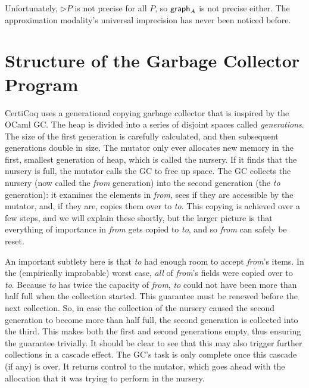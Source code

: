 \documentclass[acmsmall,review,anonymous]{acmart}\settopmatter{printfolios=true,printccs=false,printacmref=false}
\newcommand\hide[1]{}
\begin{document}
Unfortunately, $\rhd P$ is not precise for all $P$, so $\mathsf{graph}_A$ is not precise either.  The approximation modality's universal imprecision has never been noticed before.

\section{Structure of the Garbage Collector Program}
\label{apx:gcstructure}



CertiCoq uses a generational copying garbage collector 
that is inspired by the OCaml GC. 
\hide{It leans on the empirical observation that
new blocks often need to be collected soon after their
allocation, while blocks that survive this initial
culling tend to live for much longer.
}The heap is divided into a series of disjoint
spaces called \emph{generations}. The size of the first generation
is carefully calculated, and then subsequent generations
double in size.
The mutator only ever allocates new memory in the first, 
smallest generation of heap, which is called the nursery. 
If it finds that the nursery is full, 
the mutator calls the GC to free up space.
The GC collects the nursery 
(now called the \emph{from} generation)
into the second generation (the \emph{to} generation): 
it examines the elements 
in \emph{from}, sees if they are accessible by
the mutator, and, if they are, 
copies them over to \emph{to}. This copying is achieved over a few steps, 
and we will explain these shortly, but the larger picture is that 
everything of importance in \emph{from} gets copied to \emph{to}, 
and so \emph{from} can safely be reset. 

An important subtlety here is that \emph{to} had enough 
room to accept \emph{from}'s items. 
In the (empirically improbable) worst case, 
\emph{all} of \emph{from}'s fields were copied over to \emph{to}.
Because \emph{to} has twice the capacity of \emph{from},
\emph{to} could not have been more than half full when 
the collection started.
This guarantee must be renewed before the next collection. 
So, in case the collection of the nursery caused
the second generation to become more than half full, 
the second generation is collected into the third. This makes 
both the first and second generations empty, thus ensuring 
the guarantee trivially. It should be 
clear to see that this may also trigger further collections in 
a cascade effect. The GC's task is only complete once this 
cascade (if any) is over. It returns control to the mutator,
which goes ahead with 
the allocation that it was trying to perform in the nursery.
\end{document}
